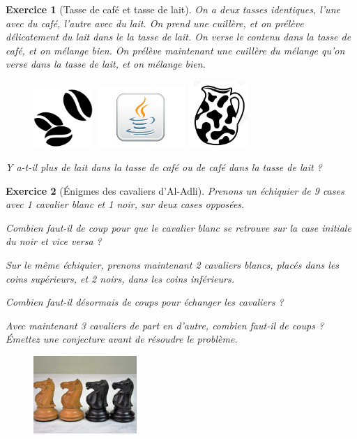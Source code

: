 \documentclass[12pt]{article}
\theoremstyle{break}
\newtheorem{exo}{Exercice}
\begin{document}
\begin{exo}[Tasse de café et tasse de lait]
On a deux tasses identiques, l'une avec du café, l'autre avec du lait. On prend une cuillère, et on prélève délicatement du lait dans le la tasse de lait. On verse le contenu dans la tasse de café, et on mélange bien. On prélève maintenant une cuillère du mélange qu'on verse dans la tasse de lait, et on mélange bien.

\begin{figure}[!ht]
	\centering
	\includegraphics[width=0.2\textwidth]{grainCafe.png}
    \includegraphics[width=0.3\textwidth]{LogoJava.png}
    \includegraphics[width=0.2\textwidth]{potAlait.jpg}
\end{figure}

Y a-t-il plus de lait dans la tasse de café ou de café dans la tasse de lait ?
\end{exo}


\begin{exo}[Énigmes des cavaliers d'Al-Adli]
Prenons un échiquier de 9 cases avec 1 cavalier blanc et 1 noir, sur deux cases opposées.

Combien faut-il de coup pour que le cavalier blanc se retrouve sur la case initiale du noir et vice versa ?

Sur le même échiquier, prenons maintenant 2 cavaliers blancs, placés dans les coins supérieurs, et 2 noirs, dans les coins inférieurs.

Combien faut-il désormais de coups pour échanger les cavaliers ?

Avec maintenant 3 cavaliers de part en d'autre, combien faut-il de coups ? \textit{Émettez une conjecture avant de résoudre le problème.}

\begin{figure}[h!]
	\centering
	\includegraphics[width=0.35\textwidth]{4Cavaliers.jpg}
\end{figure}
\end{exo}
\end{document}
